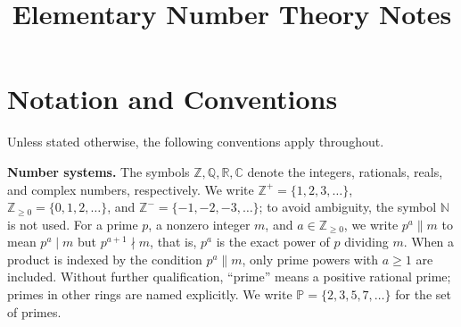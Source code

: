 \documentclass[11pt]{article}
\title{Elementary Number Theory Notes}
\author{}
\date{}
\theoremstyle{ntstyle}
\newcommand{\Primes}{\mathbb{P}}
\begin{document}
\maketitle
\newpage
\begingroup
\setlength{\parskip}{0pt}
\tableofcontents
\endgroup
\newpage

\section*{Notation and Conventions}

\medskip
\noindent Unless stated otherwise, the following conventions apply throughout.

\noindent \textbf{Number systems.} The symbols $\mathbb{Z},\mathbb{Q},\mathbb{R},\mathbb{C}$ denote the integers, rationals, reals, and complex numbers, respectively. We write $\mathbb{Z}^+=\{1,2,3,\ldots\}$, $\mathbb{Z}_{\ge0}=\{0,1,2,\ldots\}$, and $\mathbb{Z}^-=\{-1,-2,-3,\ldots\}$; to avoid ambiguity, the symbol $\mathbb{N}$ is not used. For a prime $p$, a nonzero integer $m$, and $a\in\mathbb{Z}_{\ge0}$, we write $p^{a}\parallel m$ to mean $p^{a}\mid m$ but $p^{a+1}\nmid m$, that is, $p^{a}$ is the exact power of $p$ dividing $m$. When a product is indexed by the condition $p^a\parallel m$, only prime powers with $a\ge1$ are included. Without further qualification, ``prime'' means a positive rational prime; primes in other rings are named explicitly. We write $\Primes=\{2,3,5,7,\ldots\}$ for the set of primes.
\end{document}
